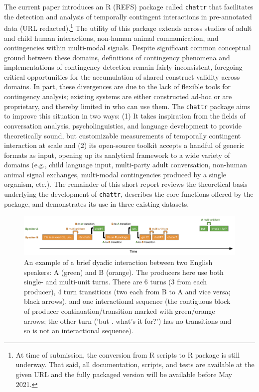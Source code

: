 \documentclass[10pt, letterpaper]{article}
\newenvironment{CodeChunk}{}{}
\begin{document}
The current paper introduces an R (REFS) package called \texttt{chattr}
that facilitates the detection and analysis of temporally contingent
interactions in pre-annotated data (URL redacted).\footnote{At time of
  submission, the conversion from R scripts to R package is still
  underway. That said, all documentation, scripts, and tests are
  available at the given URL and the fully packaged version will be
  available before May 2021.} The utility of this package extends across
studies of adult and child human interactions, non-human animal
communication, and contingencies within multi-modal signals. Despite
significant common conceptual ground between these domains, definitions
of contingency phenomena and implementations of contingency detection
remain fairly inconsistent, foregoing critical opportunities for the
accumulation of shared construct validity across domains. In part, these
divergences are due to the lack of flexible tools for contingency
analysis; existing systems are either constructed ad-hoc or are
proprietary, and thereby limited in who can use them. The
\texttt{chattr} package aims to improve this situation in two ways: (1)
It takes inspiration from the fields of conversation analysis,
psycholinguistics, and language development to provide theoretically
sound, but customizable measurements of temporally contingent
interaction at scale and (2) its open-source toolkit accepts a handful
of generic formats as input, opening up its analytical framework to a
wide variety of domains (e.g., child language input, multi-party adult
conversation, non-human animal signal exchanges, multi-modal
contingencies produced by a single organism, etc.). The remainder of
this short report reviews the theoretical basis underlying the
development of \texttt{chattr}, describes the core functions offered by
the package, and demonstrates its use in three existing datasets.

\begin{CodeChunk}
\begin{figure}[h]

{\centering \includegraphics{figs/minisequence-1} 

}

\caption[An example of a brief dyadic interaction between two English speakers]{An example of a brief dyadic interaction between two English speakers: A (green) and B (orange). The producers here use both single- and multi-unit turns. There are 6 turns (3 from each producer), 4 turn transitions (two each from B to A and vice versa; black arrows), and one interactional sequence (the contiguous block of producer continuation/transition marked with green/orange arrows; the other turn ('but-. what's it for?') has no transitions and so is not an interactional sequence).}\label{fig:minisequence}
\end{figure}
\end{CodeChunk}
\end{document}
